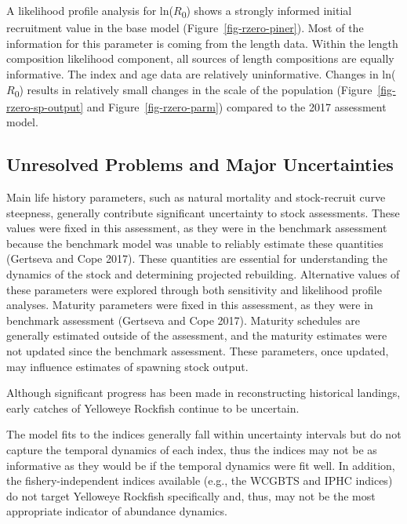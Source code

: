 \documentclass[
]{scrartcl}
\begin{document}
A likelihood profile analysis for ln(\(R\)\textsubscript{0}) shows a
strongly informed initial recruitment value in the base model
(Figure~\ref{fig-rzero-piner}). Most of the information for this
parameter is coming from the length data. Within the length composition
likelihood component, all sources of length compositions are equally
informative. The index and age data are relatively uninformative.
Changes in ln(\(R\)\textsubscript{0}) results in relatively small
changes in the scale of the population (Figure~\ref{fig-rzero-sp-output}
and Figure~\ref{fig-rzero-parm}) compared to the 2017 assessment model.

\subsection{Unresolved Problems and Major
Uncertainties}\label{unresolved-problems-and-major-uncertainties}

Main life history parameters, such as natural mortality and
stock-recruit curve steepness, generally contribute significant
uncertainty to stock assessments. These values were fixed in this
assessment, as they were in the benchmark assessment because the
benchmark model was unable to reliably estimate these quantities
(Gertseva and Cope 2017). These quantities are essential for
understanding the dynamics of the stock and determining projected
rebuilding. Alternative values of these parameters were explored through
both sensitivity and likelihood profile analyses. Maturity parameters
were fixed in this assessment, as they were in benchmark assessment
(Gertseva and Cope 2017). Maturity schedules are generally estimated
outside of the assessment, and the maturity estimates were not updated
since the benchmark assessment. These parameters, once updated, may
influence estimates of spawning stock output.

Although significant progress has been made in reconstructing historical
landings, early catches of Yelloweye Rockfish continue to be uncertain.

The model fits to the indices generally fall within uncertainty
intervals but do not capture the temporal dynamics of each index, thus
the indices may not be as informative as they would be if the temporal
dynamics were fit well. In addition, the fishery-independent indices
available (e.g., the WCGBTS and IPHC indices) do not target Yelloweye
Rockfish specifically and, thus, may not be the most appropriate
indicator of abundance dynamics.

\newpage{}
\end{document}
